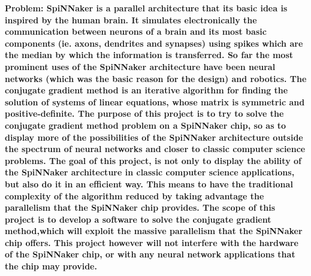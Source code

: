 \documentclass[12pt,a4paper]{article}
\begin{document}
\begin{Huge}
\newline

\end{Huge}
\begin{large}

\end{large}

\begin{large}

\end{large}
\begin{large}
\newline

\end{large}
\begin{normalsize}
\bf{Problem:}
\textnormal{	
SpiNNaker is a parallel architecture that its basic idea is inspired by the human brain. It simulates electronically the communication between neurons of a brain and its most basic components (ie. axons, dendrites and synapses) using spikes which are the median by which the information is transferred. So far the most prominent uses of the SpiNNaker architecture have been neural networks (which was the basic reason for the design) and robotics. The conjugate gradient method is an iterative algorithm for finding the solution of systems of linear equations, whose matrix is symmetric and positive-definite. The purpose of this  project is to try to solve the conjugate gradient method problem on a SpiNNaker chip, so as to display more of the possibilities of the SpiNNaker architecture outside the spectrum of neural networks and closer to classic computer science problems.}
\newline
\newline
{}
\textnormal{The goal of this project, is not only to display the ability of the SpiNNaker architecture in classic computer science applications, but also do it in an efficient way. This means to have the traditional complexity of the algorithm reduced by taking advantage the parallelism that the SpiNNaker chip provides.}
\newline
\newline
{}
\textnormal{The scope of this project is to develop a software to solve the conjugate gradient method,which will exploit the massive parallelism that the SpiNNaker chip offers. This project however will not interfere with the hardware of the SpiNNaker chip, or with any neural network applications that the chip may provide.}

\end{normalsize}
\end{document}
